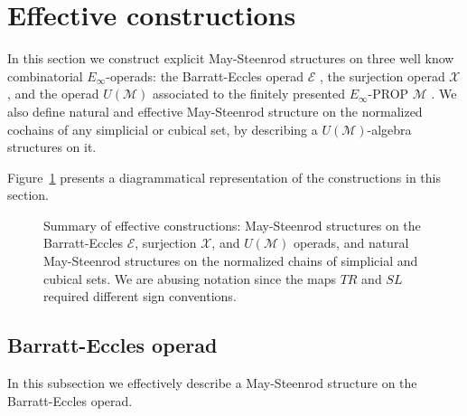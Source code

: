 
\section{Effective constructions} \label{s:effective constructions}	

In this section we construct explicit May-Steenrod structures on three well know combinatorial $E_\infty$-operads: the Barratt-Eccles operad $\mathcal E$ \cite{berger04combinatorial}, the surjection operad $\mathcal X$ \cite{mcclure03cochain}, and the operad $U(\mathcal M)$ associated to the finitely presented $E_\infty$-PROP $\mathcal M$ \cite{medina2020prop1}. We also define natural and effective May-Steenrod structure on the normalized cochains of any simplicial or cubical set, by describing a $U(\mathcal M)$-algebra structures on it.

Figure~\ref{fig: bigsummary} presents a diagrammatical representation of the constructions in this section.

\begin{figure}
	\caption{Summary of effective constructions: May-Steenrod structures on the Barratt-Eccles $\mathcal E$, surjection $\mathcal X$, and $U(\mathcal M)$ operads, and natural May-Steenrod structures on the normalized chains of simplicial and cubical sets. We are abusing notation since the maps $TR$ and $SL$ required different sign conventions.}
	\label{fig: bigsummary}
\end{figure}

\subsection{Barratt-Eccles operad} In this subsection we effectively describe a May-Steenrod structure on the Barratt-Eccles operad.

